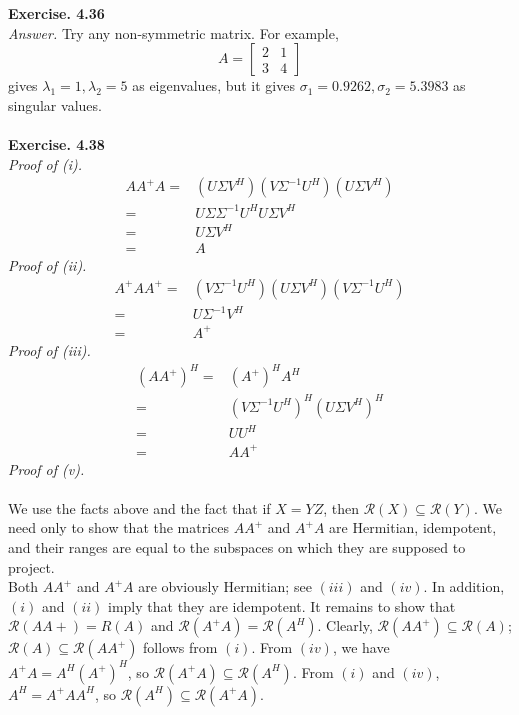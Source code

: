 \documentclass[letterpaper,12pt]{article}
\theoremstyle{definition}
\begin{document}
\textbf{Exercise. 4.36}\\
\newline
\emph{Answer.} Try any non-symmetric matrix. For example,
\[A =
\begin{bmatrix}
  2 & 1 \\
  3 & 4
\end{bmatrix}
\]
gives $\lambda_1 = 1, \lambda_2 = 5$ as eigenvalues, but it gives $\sigma_1 = 0.9262, \sigma_2 = 5.3983$ as singular values. \\\\


\textbf{Exercise. 4.38}\\
\newline
\emph{Proof of (i).}
\begin{align*}
  A A^{+} A =& (U \Sigma V^H) (V \Sigma^{-1} U^H) (U \Sigma V^H) \\
            =& U \Sigma \Sigma^{-1} U^H U \Sigma V^H \\
            =& U \Sigma V^H \\
            =& A
\end{align*}
\emph{Proof of (ii).}
\begin{align*}
  A^{+} A A^{+} =& (V \Sigma^{-1} U^H) (U \Sigma V^H) (V \Sigma^{-1} U^H) \\
                =& U \Sigma^{-1} V^H \\
                =& A^{+}
\end{align*}
\emph{Proof of (iii).}
\begin{align*}
  (AA^{+})^H =& (A^{+})^H A^H \\
             =& (V \Sigma^{-1} U^H)^H (U \Sigma V^H)^H \\
             =& U U^H \\
             =& A A^{+}
\end{align*}
\emph{Proof of (v).} \\\\
We use the facts above and the fact that if $X=YZ$, then $ \mathcal{R}(X) \subseteq \mathcal{R}(Y)$. We need only to show that the matrices $AA^{+}$ and $A^{+}A$ are Hermitian, idempotent, and their ranges are equal to the subspaces on which they are supposed to project. \\

Both $AA^{+}$ and $A^{+}A$ are obviously Hermitian; see $(iii)$ and $(iv)$. In addition, $(i)$ and $(ii)$ imply that they are idempotent. It remains to show that $\mathcal{R}(AA+)=R(A)$ and $\mathcal{R}(A^{+}A)=\mathcal{R}(A^H)$. Clearly, $\mathcal{R}(AA^{+}) \subseteq \mathcal{R}(A)$; $\mathcal{R}(A) \subseteq \mathcal{R}(A A^{+})$ follows from $(i)$. From $(iv)$, we have $A^{+}A=A^H (A^{+})^H$, so $\mathcal{R}(A^{+}A) \subseteq \mathcal{R}(A^H)$. From $(i)$ and $(iv)$, $A^H=A^{+}AA^H$, so $\mathcal{R}(A^H) \subseteq \mathcal{R}(A^{+}A)$.
\end{document}
